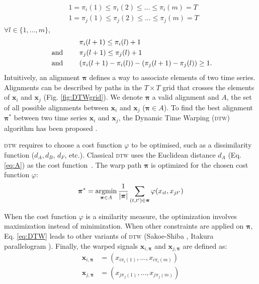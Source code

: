 \begin{align}
& 1 = \pi_i(1) \leq \pi_i(2) \leq ... \leq \pi_i(m) = T \\
& 1 = \pi_j(1) \leq \pi_j(2) \leq ... \leq \pi_j(m) = T 
\end{align}
$\forall l \in \{1, ..., m\}$, 
\begin{align}
& \pi_i(l+1) \leq \pi_i(l)+1 \\
\text{  and  \qquad} & \pi_j(l+1) \leq \pi_j(l)+1 \\
\text{  and  \qquad} & ( \pi_i(l+1)-\pi_i(l) ) - ( \pi_j(l+1)-\pi_j(l)) \geq 1 . 
\end{align}
Intuitively, an alignment $\boldsymbol{\pi}$ defines a way to associate elements of two time series. Alignments can be described by paths in the $T \times T$ grid that crosses the elements of $\textbf{x}_i$ and $\textbf{x}_j$ (Fig. \ref{fig:DTWgrid}). We denote $\boldsymbol{\pi}$ a valid alignment and $A$, the set of all possible alignments between $\textbf{x}_i$ and $\textbf{x}_j$ ($\boldsymbol{\pi} \in A$). To find the best alignment $\boldsymbol{\pi}^*$ between two time series $\textbf{x}_i$ and $\textbf{x}_j$, the Dynamic Time Warping (\textsc{dtw}) algorithm has been proposed \cite{Keogh2004,Salvador}.

\textsc{dtw} requires to choose a cost function $\varphi$ to be optimised, such as a dissimilarity function ($d_A, d_B$, $d_F$, etc.). Classical \textsc{dtw} uses the Euclidean distance $d_A$ (Eq. \ref{eq:A}) as the cost function~\cite{Berndt1994a}. The warp path $\boldsymbol{\pi}$ is optimized for the chosen cost function $\varphi$:
\begin{equation}
\boldsymbol{\pi}^* = \argmin_{\boldsymbol{\pi} \in A} \frac{1}{|\boldsymbol{\pi}|}
\sum_{(t,t') \in \boldsymbol{\pi}} \varphi(x_{it}, x_{jt'})
\label{eq:DTW}
\end{equation}

\noindent When the cost function $\varphi$ is a similarity measure, the optimization involves maximization instead of minimization. When other constraints are applied on $\boldsymbol{\pi}$, Eq. \eqref{eq:DTW} leads to other variants of \textsc{dtw} (Sakoe-Shiba \cite{Sakoe1978a}, Itakura parallelogram \cite{Rabiner1993}). Finally, the warped signals $\textbf{x}_{i,\boldsymbol{\pi}}$ and $\textbf{x}_{j,\boldsymbol{\pi}}$ are defined as:
\begin{align}
\textbf{x}_{i,\boldsymbol{\pi}} 
&= (x_{i\pi_i(1)}, ..., 
x_{i\pi_i(m)}) 			\\	
\textbf{x}_{j,\boldsymbol{\pi}} 
&= (x_{j\pi_j(1)}, ..., 
x_{j\pi_j(m)}) 	
\end{align}

